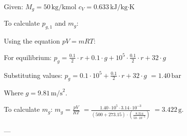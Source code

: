 Given:  
\( M_g = 50 \, \text{kg/kmol} \)  
\( c_V = 0.633 \, \text{kJ/kg·K} \)  

To calculate \( p_{g,1} \) and \( m_g \):  

Using the equation \( pV = mRT \):  

For equilibrium:  
\( p_g = \frac{0.1}{2} \cdot r + 0.1 \cdot g + 10^5 \cdot \frac{0.1}{2} \cdot r + 32 \cdot g \)  

Substituting values:  
\( p_g = 0.1 \cdot 10^5 + \frac{0.1}{2} \cdot r + 32 \cdot g \)  
\( = 1.40 \, \text{bar} \)  

Where \( g = 9.81 \, \text{m/s}^2 \).  

To calculate \( m_g \):  
\( m_g = \frac{pV}{RT} \)  
\( = \frac{1.40 \cdot 10^5 \cdot 3.14 \cdot 10^{-3}}{(500 + 273.15) \cdot \left(\frac{8.314}{50 \cdot 10^{-3}}\right)} \)  
\( = 3.422 \, \text{g} \).  

---